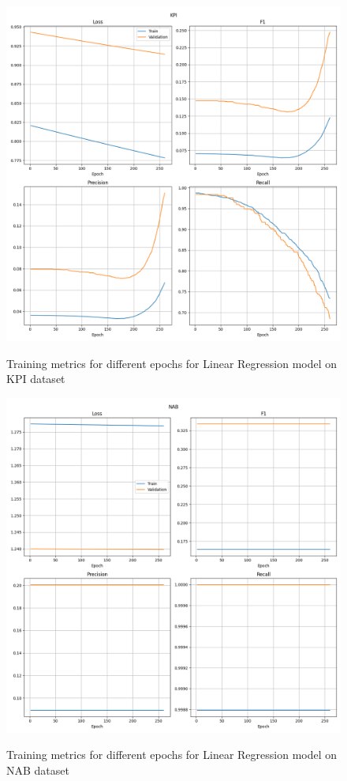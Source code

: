 \documentclass[a4paper, twoside]{report}
\theoremstyle{definition}
\numberwithin{equation}{section}
\begin{document}
\begin{figure}[h!]
    \centering
    \caption{Training metrics for different epochs for Linear Regression model on KPI dataset}
    \includegraphics[width=\textwidth]{plots/LinearRegression_KPI.png}
    \label{fig:LinearRegression_KPI_training}
\end{figure}

\begin{figure}[h!]
    \centering
    \caption{Training metrics for different epochs for Linear Regression model on NAB dataset}
    \includegraphics[width=\textwidth]{plots/LinearRegression_NAB.png}
    \label{fig:LinearRegression_NAB_training}
\end{figure}





\end{document}
